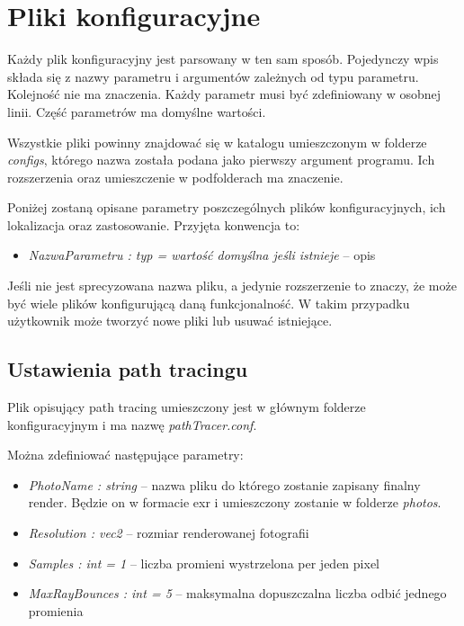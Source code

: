 \documentclass[inz,shortabstract]{iithesis}
\begin{document}
    \section{Pliki konfiguracyjne}
        Każdy plik konfiguracyjny jest parsowany w ten sam sposób. Pojedynczy wpis składa się z nazwy parametru i argumentów zależnych od typu parametru. Kolejność nie ma znaczenia. Każdy parametr musi być zdefiniowany w osobnej linii. Część parametrów ma domyślne wartości. 
        
        Wszystkie pliki powinny znajdować się w katalogu umieszczonym w folderze \textit{configs}, którego nazwa została podana jako pierwszy argument programu. Ich rozszerzenia oraz umieszczenie w podfolderach ma znaczenie.
        
        Poniżej zostaną opisane parametry poszczególnych plików konfiguracyjnych, ich lokalizacja oraz zastosowanie. Przyjęta konwencja to:
        \begin{itemize}
            \item \textit{NazwaParametru : typ = wartość domyślna jeśli istnieje} -- opis
        \end{itemize}
        
        Jeśli nie jest sprecyzowana nazwa pliku, a jedynie rozszerzenie to znaczy, że może być wiele plików konfigurującą daną funkcjonalność. W takim przypadku użytkownik może tworzyć nowe pliki lub usuwać istniejące.
        
        \subsection{Ustawienia path tracingu} \label{pathTracerConfig}
        Plik opisujący path tracing umieszczony jest w głównym folderze konfiguracyjnym i ma nazwę \textit{pathTracer.conf}.
        
        Można zdefiniować następujące parametry:
        \begin{itemize}
            \item \textit{PhotoName : string} -- nazwa pliku do którego zostanie zapisany finalny render. Będzie on w formacie exr i umieszczony zostanie w folderze \textit{photos}.
            \item \textit{Resolution : vec2} -- rozmiar renderowanej fotografii
            \item \textit{Samples : int = 1} -- liczba promieni wystrzelona per jeden pixel
            \item \textit{MaxRayBounces : int = 5} -- maksymalna dopuszczalna liczba odbić jednego promienia  
        \end{itemize}
\end{document}
